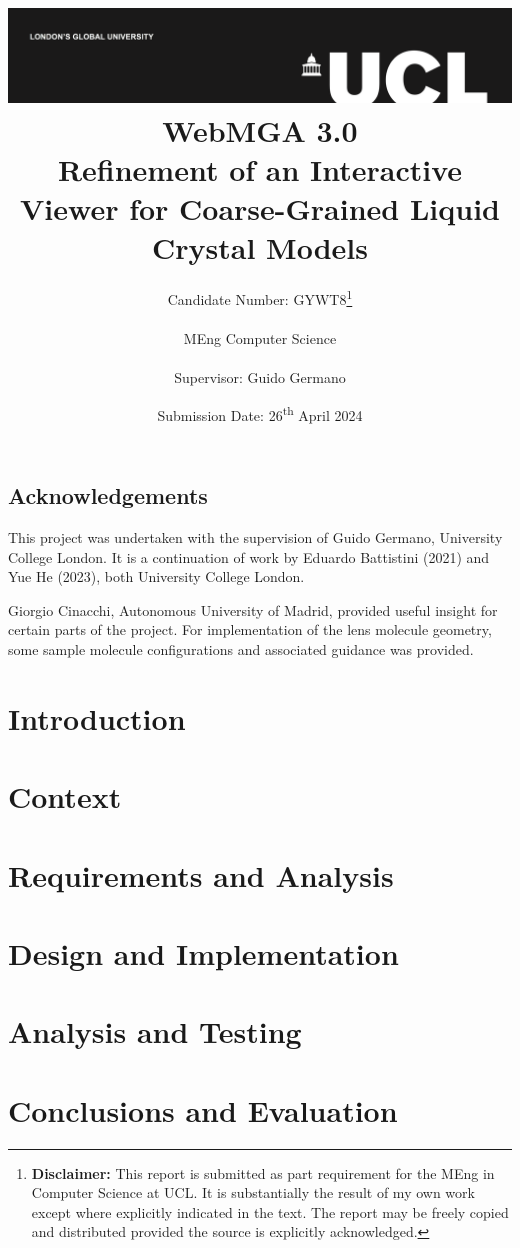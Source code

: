 \documentclass[a4paper,12pt]{report}
\title{
{\vspace{-14em} \includegraphics[width=\textwidth]{assets/images/ucl}}\\
{{\Huge WebMGA 3.0}}\\
{\large Refinement of an Interactive Viewer for Coarse-Grained Liquid Crystal Models}\\
}
\date{Submission Date: 26\textsuperscript{th} April 2024}
\author{Candidate Number: GYWT8\thanks{
{\bf Disclaimer:}
This report is submitted as part requirement for the MEng in Computer Science at UCL. It is
substantially the result of my own work except where explicitly indicated in the text. The report may be freely copied and distributed provided the source is explicitly acknowledged.}
\\ \\
MEng Computer Science\\ \\
Supervisor: Guido Germano}
\begin{document}
 
\onehalfspacing
\maketitle

\begin{abstract}

\end{abstract}

\tableofcontents

\setcounter{page}{1}
\section{Acknowledgements}
This project was undertaken with the supervision of Guido Germano, University College London. It is a continuation of work by Eduardo Battistini (2021) and Yue He (2023), both University College London.

Giorgio Cinacchi, Autonomous University of Madrid, provided useful insight for certain parts of the project. For implementation of the lens molecule geometry, some sample molecule configurations and associated guidance was provided.

\chapter{Introduction}


\chapter{Context}


\chapter{Requirements and Analysis}


\chapter{Design and Implementation}








\chapter{Analysis and Testing}


\chapter{Conclusions and Evaluation}
\end{document}
